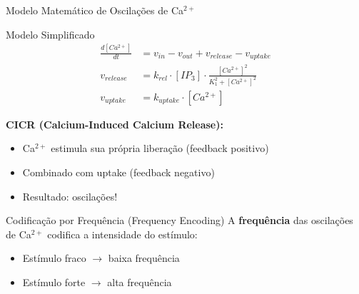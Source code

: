 \begin{frame}{Modelo Matemático de Oscilações de Ca$^{2+}$}
\begin{block}{Modelo Simplificado}
\begin{equation*}
\begin{aligned}
\frac{d[Ca^{2+}]}{dt} &= v_{in} - v_{out} + v_{release} - v_{uptake}\\
v_{release} &= k_{rel} \cdot [IP_3] \cdot \frac{[Ca^{2+}]^2}{K_1^2 + [Ca^{2+}]^2}\\
v_{uptake} &= k_{uptake} \cdot [Ca^{2+}]
\end{aligned}
\end{equation*}

\textbf{CICR (Calcium-Induced Calcium Release):}
\begin{itemize}
    \item Ca$^{2+}$ estimula sua própria liberação (feedback positivo)
    \item Combinado com uptake (feedback negativo)
    \item Resultado: oscilações!
\end{itemize}
\end{block}

\begin{exampleblock}{Codificação por Frequência (Frequency Encoding)}
A \textbf{frequência} das oscilações de Ca$^{2+}$ codifica a intensidade do estímulo:
\begin{itemize}
    \item Estímulo fraco $\rightarrow$ baixa frequência
    \item Estímulo forte $\rightarrow$ alta frequência
\end{itemize}
\end{exampleblock}
\end{frame}

